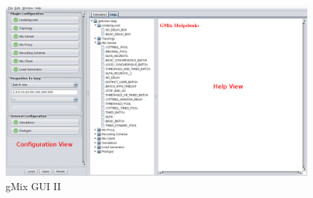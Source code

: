 \documentclass[a4paper, 11pt]{article} %
\begin{document}
\begin{figure}[!htp]
\includegraphics[width=\textwidth]{img/gMixGuiHelp}
\caption{gMix GUI II}
\label{fig:gui2}
\end{figure}
\end{document}
